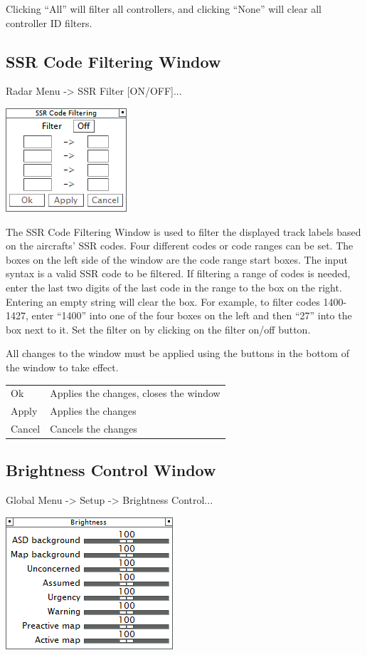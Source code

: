 \documentclass[11pt,a4paper,oldfontcommands]{memoir}
\begin{document}
Clicking “All” will filter all controllers, and clicking “None” will clear all controller ID filters.

\subsection{SSR Code Filtering Window}
\label{win:ssr}

Radar Menu -> SSR Filter [ON/OFF]...

\includegraphics{img/ssrfil.png}

The SSR Code Filtering Window is used to filter the displayed track labels based on the aircrafts’ SSR codes. Four different codes or code ranges can be set. The boxes on the left side of the window are the code range start boxes. The input syntax is a valid SSR code to be filtered. If filtering a range of codes is needed, enter the last two digits of the last code in the range to the box on the right. Entering an empty string will clear the box. For example, to filter codes 1400-1427, enter “1400” into one of the four boxes on the left and then “27” into the box next to it. Set the filter on by clicking on the filter on/off button.

All changes to the window must be applied using the buttons in the bottom of the window to take effect.

\begin{tabular}{l l}
    Ok      & Applies the changes, closes the window\\
    Apply   & Applies the changes\\
    Cancel  & Cancels the changes\\
\end{tabular}

\subsection{Brightness Control Window}
\label{win:bcw}

Global Menu -> Setup -> Brightness Control...

\includegraphics{img/bright.png}
\end{document}
